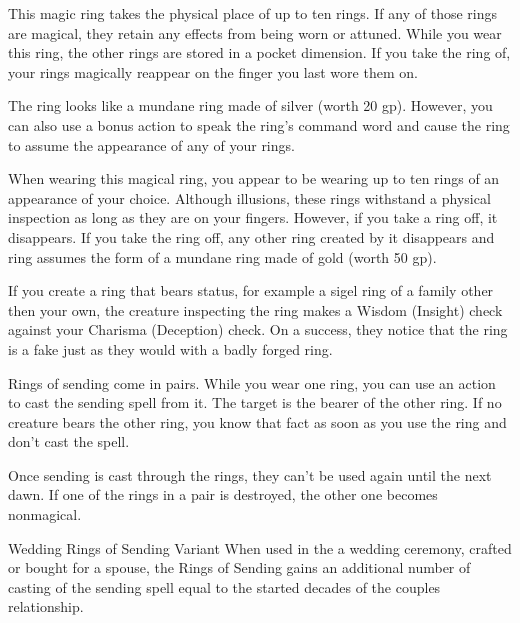 \documentclass[letter,10pt,twocolumn,openany]{dndbook}
\begin{document}
\pagebreak


This magic ring takes the physical place of up to ten rings.
If any of those rings are magical, they retain any effects from being worn or attuned.
While you wear this ring, the other rings are stored in a pocket dimension.
If you take the ring of, your rings magically reappear on the finger you last wore them on.

The ring looks like a mundane ring made of silver (worth 20 gp).
However, you can also use a bonus action to speak the ring's command word and cause the ring to assume the appearance of any of your rings.


When wearing this magical ring, you appear to be wearing up to ten rings of an appearance of your choice.
Although illusions, these rings withstand a physical inspection as long as they are on your fingers.
However, if you take a ring off, it disappears.
If you take the ring off, any other ring created by it disappears and ring assumes the form of a mundane ring made of gold (worth 50 gp).

If you create a ring that bears status, for example a sigel ring of a family other then your own, the creature inspecting the ring makes a Wisdom (Insight) check against your Charisma (Deception) check.
On a success, they notice that the ring is a fake just as they would with a badly forged ring.

\pagebreak


Rings of sending come in pairs.
While you wear one ring, you can use an action to cast the sending spell from it.
The target is the bearer of the other ring.
If no creature bears the other ring, you know that fact as soon as you use the ring and don't cast the spell.

Once sending is cast through the rings, they can't be used again until the next dawn.
If one of the rings in a pair is destroyed, the other one becomes nonmagical.

\begin{DndComment}{Wedding Rings of Sending Variant}
    When used in the a wedding ceremony, crafted or bought for a spouse,
    the Rings of Sending gains an additional number of casting of the sending spell equal to the started decades of the couples relationship.
\end{DndComment}
\end{document}

